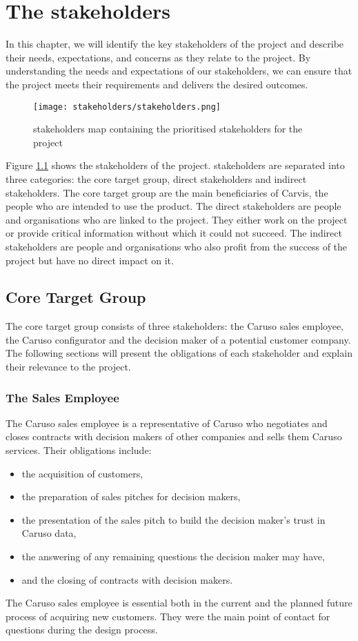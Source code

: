 \chapter{The \Glspl{stakeholder}}
In this chapter, we will identify the key \glspl{stakeholder} of the project and describe their needs, expectations, and concerns as they relate to the project. By understanding the needs and expectations of our \glspl{stakeholder}, we can ensure that the project meets their requirements and delivers the desired outcomes.
\begin{figure}[ht]
  \centering
  \texttt{[image: stakeholders/stakeholders.png]}
  \caption{\Glspl{stakeholder} map containing the prioritised  \glspl{stakeholder} for the project}
  \label{Kap2:Stakeholders}
\end{figure}
Figure \ref{Kap2:Stakeholders} shows the \glspl{stakeholder} of the project. \Glspl{stakeholder} are separated into three categories: the core target group, direct \glspl{stakeholder} and indirect \glspl{stakeholder}. The core target group are the main beneficiaries of Carvis, the people who are intended to use the product. The direct \glspl{stakeholder} are people and organisations who are linked to the project. They either work on the project or provide critical information without which it could not succeed. The indirect \glspl{stakeholder} are people and organisations who also profit from the success of the project but have no direct impact on it.

\section{Core Target Group}
The core target group consists of three \glspl{stakeholder}: the Caruso sales employee, the Caruso configurator and the decision maker of a potential customer company. The following sections will present the obligations of each \gls{stakeholder} and explain their relevance to the project.

\subsection{The Sales Employee}
The Caruso sales employee is a representative of Caruso who negotiates and closes contracts with decision makers of other companies and sells them Caruso services. Their obligations include:
\begin{itemize}
  \item the acquisition of customers,
  \item the preparation of sales pitches for decision makers,
  \item the presentation of the sales pitch to build the decision maker's trust in Caruso data,
  \item the answering of any remaining questions the decision maker may have,
  \item and the closing of contracts with decision makers.
\end{itemize}
The Caruso sales employee is essential both in the current and the planned future process of acquiring new customers. They were the main point of contact for questions during the design process.

